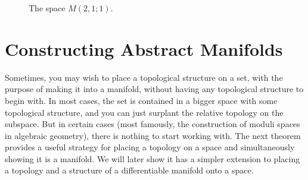 \begin{figure}
\begin{center}
\end{center}
\caption{The space $M(2,1;1)$.}
\end{figure}

\section{Constructing Abstract Manifolds}

Sometimes, you may wish to place a topological structure on a set, with the purpose of making it into a manifold, without having any topological structure to begin with. In most cases, the set is contained in a bigger space with some topological structure, and you can just surplant the relative topology on the subspace. But in certain cases (most famously, the construction of moduli spaces in algebraic geometry), there is nothing to start working with. The next theorem provides a useful strategy for placing a topology on a space and simultaneously showing it is a manifold. We will later show it has a simpler extension to placing a topology and a structure of a differentiable manifold onto a space.

